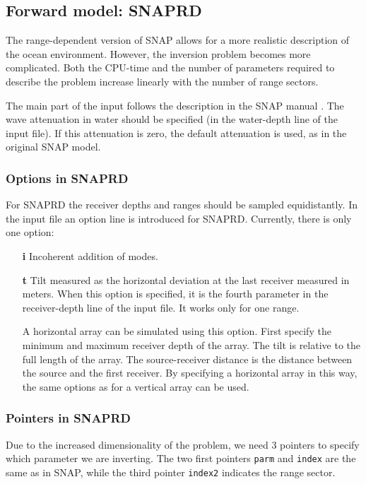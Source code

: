 \documentclass{saclantc}
\begin{document}
\subsection{Forward model: SNAPRD }
 \label{se:snaprd}
The range-dependent version of {\sf SNAP} allows for a more realistic
description of the ocean environment. However, the inversion
problem becomes more complicated. Both the CPU-time
 and the number of parameters required to describe the problem 
increase linearly with the number of range sectors. 

The main part of the input follows the description in the {\sf SNAP} manual
\cite{snap}. The wave attenuation in 
water should be specified (in the water-depth line of the input file). 
If this attenuation is zero, the default attenuation
is used, as in the original {\sf SNAP} model.

\subsubsection{Options in SNAPRD}
For {\sf SNAPRD} the receiver depths and ranges should be sampled equidistantly.
In the input file  an option line is introduced for {\sf SNAPRD}. 
Currently, there is only one option:
\begin{itemize}
 \item[\bf i]     Incoherent addition of modes.
 \item[\bf t]     Tilt measured as the horizontal
deviation at the last receiver measured in meters. 
When this option is specified, it is the fourth parameter in
the receiver-depth line of the input file. 
It works only for one range.

A horizontal array can be simulated using this option. First specify
the minimum and maximum receiver depth of the array. The tilt
is relative to the full length of the array. The source-receiver distance
is the distance between the source and the first receiver. By
specifying a horizontal array in this way, the same options as for a
vertical array can be used.
\end{itemize}

\subsubsection{Pointers in SNAPRD}
Due to the increased dimensionality of the problem, we need 3 pointers to specify
which parameter we are inverting. The two first pointers {\tt parm} and
{\tt index} are the same as in
{\sf SNAP}, while the third pointer {\tt index2} indicates the range sector.
\end{document}
